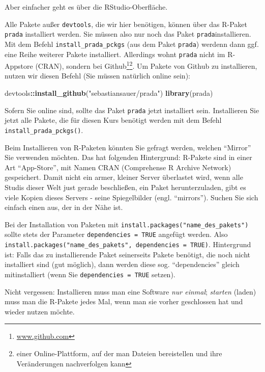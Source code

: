 \documentclass[12pt,ngerman,]{book}
\makeatletter
\newenvironment{Shaded}{\begin{snugshade}}{\end{snugshade}}
\newcommand{\KeywordTok}[1]{\textcolor[rgb]{0.13,0.29,0.53}{\textbf{#1}}}
\newcommand{\StringTok}[1]{\textcolor[rgb]{0.31,0.60,0.02}{#1}}
\newcommand{\OperatorTok}[1]{\textcolor[rgb]{0.81,0.36,0.00}{\textbf{#1}}}
\newcommand{\NormalTok}[1]{#1}
\let\rmarkdownfootnote\footnote%
\def\footnote{\protect\rmarkdownfootnote}
\renewcommand{\href}[2]{#2\footnote{\url{#1}}}
\newenvironment{kframe}{%
\medskip{}
\setlength{\fboxsep}{.8em}
 \def\at@end@of@kframe{}%
 \ifinner\ifhmode%
  \def\at@end@of@kframe{\end{minipage}}%
  \begin{minipage}{\columnwidth}%
 \fi\fi%
 \def\FrameCommand##1{\hskip\@totalleftmargin \hskip-\fboxsep
 \colorbox{shadecolor}{##1}\hskip-\fboxsep
     \hskip-\linewidth \hskip-\@totalleftmargin \hskip\columnwidth}%
 \MakeFramed {\advance\hsize-\width
   \@totalleftmargin\z@ \linewidth\hsize
   \@setminipage}}%
 {\par\unskip\endMakeFramed%
 \at@end@of@kframe}
\renewenvironment{Shaded}{\begin{kframe}}{\end{kframe}}
\theoremstyle{definition}
\theoremstyle{definition}
\theoremstyle{remark}
\let\BeginKnitrBlock\begin \let\EndKnitrBlock\end
\makeatother
\begin{document}
Aber einfacher geht es über die RStudio-Oberfläche.

Alle Pakete außer \texttt{devtools}, die wir hier benötigen, können über
das R-Paket \texttt{prada} installiert werden. Sie müssen also nur noch
das Paket \texttt{prada}installieren. Mit dem Befehl
\texttt{install\_prada\_pckgs} (aus dem Paket \texttt{prada}) werdenn
dann ggf. eine Reihe weiterer Pakete installiert. Allerdings wohnt
\texttt{prada} nicht im R-Appstore (CRAN), sondern bei
\href{www.github.com}{Github}\footnote{einer Online-Plattform, auf der
  man Dateien bereistellen und ihre Veränderungen nachverfolgen kann}.
Um Pakete von Github zu installieren, nutzen wir diesen Befehl (Sie
müssen natürlich online sein):

\begin{Shaded}
\begin{Highlighting}[]
\NormalTok{devtools}\OperatorTok{::}\KeywordTok{install_github}\NormalTok{(}\StringTok{"sebastiansauer/prada"}\NormalTok{)}
\KeywordTok{library}\NormalTok{(prada)}
\end{Highlighting}
\end{Shaded}

Sofern Sie online sind, sollte das Paket \texttt{prada} jetzt
installiert sein. Installieren Sie jetzt alle Pakete, die für diesen
Kurs benötigt werden mit dem Befehl \texttt{install\_prada\_pckgs()}.

\BeginKnitrBlock{rmdcaution}
Beim Installieren von R-Paketen könnten Sie gefragt werden, welchen
``Mirror'' Sie verwenden möchten. Das hat folgenden Hintergrund:
R-Pakete sind in einer Art ``App-Store'', mit Namen CRAN (Comprehense R
Archive Network) gespeichert. Damit nicht ein armer, kleiner Server
überlastet wird, wenn alle Studis dieser Welt just gerade beschließen,
ein Paket herunterzuladen, gibt es viele Kopien dieses Servers - seine
Spiegelbilder (engl. ``mirrors''). Suchen Sie sich einfach einen aus,
der in der Nähe ist.

Bei der Installation von Paketen mit
\texttt{install.packages("name\_des\_pakets")} sollte stets der
Parameter \texttt{dependencies\ =\ TRUE} angefügt werden. Also
\texttt{install.packages("name\_des\_pakets",\ dependencies\ =\ TRUE)}.
Hintergrund ist: Falls das zu installierende Paket seinerseits Pakete
benötigt, die noch nicht installiert sind (gut möglich), dann werden
diese sog. ``dependencies'' gleich mitinstalliert (wenn Sie
\texttt{dependencies\ =\ TRUE} setzen).
\EndKnitrBlock{rmdcaution}

Nicht vergessen: Installieren muss man eine Software \emph{nur einmal};
\emph{starten} (laden) muss man die R-Pakete jedes Mal, wenn man sie
vorher geschlossen hat und wieder nutzen möchte.
\end{document}
